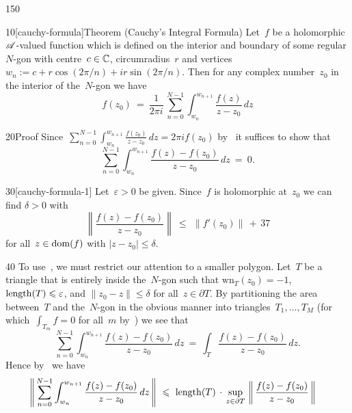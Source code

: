 \begin{parsec}{150}%
\begin{point}{10}[cauchy-formula]{Theorem (Cauchy's Integral Formula)}%
%
Let~$f$ be a holomorphic $\mathscr{A}$-valued function
which is defined on the interior and boundary
of some regular $N$-gon 
with centre~$c\in\mathbb{C}$,
circumradius~$r$
and vertices $w_n := c+r\cos(2\pi/n)+ir\sin(2\pi/n)$.
Then for any complex number~$z_0$ in
the interior of the~$N$-gon
we have
\begin{equation*}
	f(z_0)\ = \ \frac{1}{2\pi i}\,\sum_{n=0}^{N-1}\int_{w_n}^{w_{n+1}}
	\frac{f(z)}{z-z_0}\,dz
\end{equation*}
\begin{point}{20}{Proof}%
	Since~$\sum_{n=0}^{N-1} \int_{w_n}^{w_{n+1}} \frac{f(z_0)}{z-z_0}\,dz
	= 2\pi i f(z_0)$ by~
it suffices to show that
\begin{equation}
\label{eq:cauchy-formula-1}
\sum_{n=0}^{N-1}\int_{w_n}^{w_{n+1}} \frac{f(z)-f(z_0)}{z-z_0}\,dz \ = \ 0.
\end{equation}
\begin{point}{30}[cauchy-formula-1]%
Let~$\varepsilon>0$ be given.
Since~$f$ is holomorphic at~$z_0$
we can find $\delta>0$ with
\begin{equation*}
\left\|\frac{f(z)-f(z_0)}{z-z_0}\right\|
\ \leq \ \,\|f'(z_0)\|\,+\,37
\end{equation*}
for all~$z\in\operatorname{dom}(f)$ with $\left|z-z_0\right|\leq \delta$. 
\end{point}
\begin{point}{40}%
To use~,
we must restrict our attention to a smaller polygon.
Let~$T$ be a triangle 
that is entirely inside the~$N$-gon
such that  $\mathrm{wn}_T(z_0)=-1$,
$\operatorname{length}(T)\leqslant \varepsilon$,
and $\|z_0-z\|\leq \delta$ for all~$z\in \partial T$.
By partitioning the area
between~$T$ and the~$N$-gon
in the obvious manner
into triangles~$T_1,\dotsc,T_M$
(for which~$\int_{T_m}f=0$ for all~$m$ by~)
we see that
\begin{equation}
\label{eq:cauchy-formula-2}
\sum_{n=0}^{N-1}\int_{w_n}^{w_{n+1}} \frac{f(z)-f(z_0)}{z-z_0}\,dz
\ = \ 
\int_T \frac{f(z)-f(z_0)}{z-z_0}\,dz.
\end{equation}
Hence by~
we have
\begin{alignat*}{3}
	\left\|\,\sum_{n=0}^{N-1} 
	\int_{w_n}^{w_{n+1}} \frac{f(z)-f(z_0)}{z-z_0}\,dz\,\right\|
	\ &\leq \ \length(T)\,\cdot\,
\sup_{z\in\partial T} \,\left\|\,\frac{f(z)-f(z_0)}{z-z_0}\,\right\|

\end{alignat*}
\end{point}
\end{point}
\end{point}
\end{parsec}
